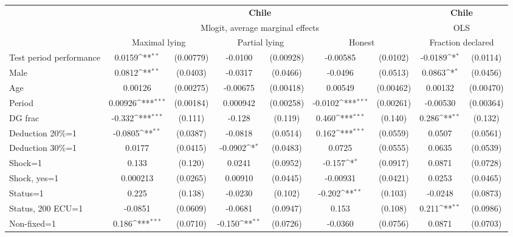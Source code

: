 \def\sym#1{\ifmmode^{#1}\else\(^{#1}\)\fi}
\begin{tabular}{l|cccccc|cc}
\hline\hline
&\multicolumn{6}{c|}{\bf Chile}&\multicolumn{2}{c}{\bf Chile}\\ &\multicolumn{6}{c|}{Mlogit, average marginal effects }&\multicolumn{2}{c}{OLS}\\
                &\multicolumn{2}{c}{Maximal lying}&\multicolumn{2}{c}{Partial lying}&\multicolumn{2}{c}{Honest}  &\multicolumn{2}{c}{Fraction declared}\\
\hline
Test period performance&   0.0159\sym{**} &(0.00779)&  -0.0100         &(0.00928)& -0.00585         & (0.0102)&  -0.0189\sym{*}  & (0.0114)\\
Male            &   0.0812\sym{**} & (0.0403)&  -0.0317         & (0.0466)&  -0.0496         & (0.0513)&   0.0863\sym{*}  & (0.0456)\\
Age             &  0.00126         &(0.00275)& -0.00675         &(0.00418)&  0.00549         &(0.00462)&  0.00132         &(0.00470)\\
Period          &  0.00926\sym{***}&(0.00184)& 0.000942         &(0.00258)&  -0.0102\sym{***}&(0.00261)& -0.00530         &(0.00364)\\
DG frac         &   -0.332\sym{***}&  (0.111)&   -0.128         &  (0.119)&    0.460\sym{***}&  (0.140)&    0.286\sym{**} &  (0.132)\\
Deduction 20\%=1&  -0.0805\sym{**} & (0.0387)&  -0.0818         & (0.0514)&    0.162\sym{***}& (0.0559)&   0.0507         & (0.0561)\\
Deduction 30\%=1&   0.0177         & (0.0415)&  -0.0902\sym{*}  & (0.0483)&   0.0725         & (0.0555)&   0.0635         & (0.0539)\\
Shock=1         &    0.133         &  (0.120)&   0.0241         & (0.0952)&   -0.157\sym{*}  & (0.0917)&   0.0871         & (0.0728)\\
Shock, yes=1    & 0.000213         & (0.0265)&  0.00910         & (0.0445)& -0.00931         & (0.0421)&   0.0253         & (0.0465)\\
Status=1        &    0.225         &  (0.138)&  -0.0230         &  (0.102)&   -0.202\sym{**} &  (0.103)&  -0.0248         & (0.0873)\\
Status, 200 ECU=1&  -0.0851         & (0.0609)&  -0.0681         & (0.0947)&    0.153         &  (0.108)&    0.211\sym{**} & (0.0986)\\
Non-fixed=1     &    0.186\sym{***}& (0.0710)&   -0.150\sym{**} & (0.0726)&  -0.0360         & (0.0756)&   0.0871         & (0.0703)\\

\end{tabular}
